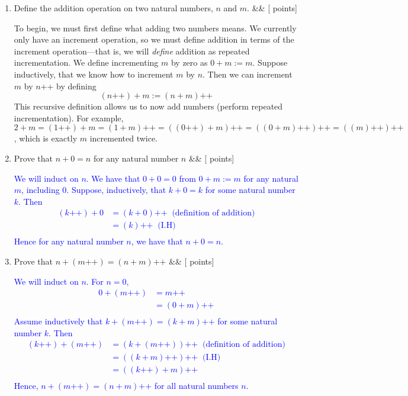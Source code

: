 \documentclass[12pt]{article}
\newcommand{\points}[1]{\hfill {[#1 points]}}
\newcommand{\problem}[2][]{%
  \item {#2}%
  \ifx&#1&%
  \else%
    \points{#1}%
  \fi
  \par\vspace{0.5em}
}
\begin{document}
\begin{enumerate}[leftmargin=*, label=\textbf{\arabic*.}]

    \problem{Define the addition operation on two natural numbers, $n$ and $m$.}
	To begin, we must first define what adding two numbers means. We currently only have an increment operation, so we must define addition in terms of the increment operation—that is, we will \textit{define} addition as repeated incrementation. We define incrementing $m$ by zero as $0 + m := m$. Suppose inductively, that we know how to increment $m$ by $n$. Then we can increment $m$ by $n$++ by defining $$(n\text{++}) + m := (n + m)\text{++}$$ This recursive definition allows us to now add numbers (perform repeated incrementation). For example, $2+m = (1\text{++})+m = (1+m)\text{++} = ((0\text{++})+m)\text{++} = ((0+m)\text{++})\text{++} = ((m)\text{++})\text{++}$, which is exactly $m$ incremented twice.
	
    \problem{Prove that $n+0 = n$ for any natural number $n$}
        	\textcolor{blue}{ We will induct on $n$. We have that $0+0 = 0$ from $0 + m := m$ for any natural $m$, including $0$. Suppose, inductively, that $k+0=k$ for some natural number $k$. Then 
	\begin{align*}
	(k\text{++}) + 0 &= (k+0)\text{++} \;\; \text{(definition of addition)} \\
	&= (k)\text{++} \;\; \text{(I.H)} \\
	\end{align*}
	Hence for any natural number $n$, we have that $n+0 = n$.
}

    \problem{Prove that $n + (m\text{++}) = (n + m)\text{++}$}
        	\textcolor{blue}{We will induct on $n$. For $n = 0$,
	\begin{align*}
	0 + (m\text{++}) &= m\text{++} \\
	&= (0 + m)\text{++} \\
	\end{align*}
	Assume inductively that $k + (m\text{++}) = (k + m)\text{++}$ for some natural number $k$. Then
	\begin{align*}
	(k\text{++}) + (m\text{++}) &= (k + (m\text{++}))\text{++}  \;\; \text{(definition of addition)}\\
	&= ((k+m)\text{++})\text{++} \;\; \text{(I.H)} \\
	&= ((k\text{++}) + m)\text{++} \\
	\end{align*}
	Hence, $n + (m\text{++}) = (n + m)\text{++}$ for all natural numbers $n$.}
	

\end{enumerate}
\end{document}
